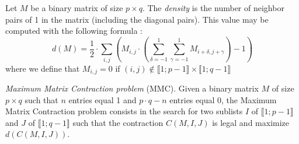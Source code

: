 \begin{definition}
	Let $M$ be a binary matrix of size $p \times q$. The \emph{density} is the number of neighbor pairs of 1 in the matrix (including the diagonal pairs). This value may be computed with the following formula :
	$$ 
	d(M) = \frac{1}{2} \cdot \sum\limits_{i,j} \left( M_{i,j} \cdot \left(\sum\limits_{\delta = -1}^1 \sum\limits_{\gamma = -1}^1  M_{i+\delta,j+\gamma}\right) - 1 \right)
	$$
	where we define that $M_{i,j}=0$ if $(i,j) \notin \llbracket 1;p-1 \rrbracket \times \llbracket 1;q-1 \rrbracket$
\end{definition}

\begin{problem}\label{problem1}
	\emph{Maximum Matrix Contraction problem} (MMC). Given a binary matrix $M$ of size $p \times q$ such that $n$ entries equal 1 and $p \cdot q - n$ entries equal 0, the Maximum Matrix Contraction problem consists in the search for two sublists $I$ of $\llbracket 1;p-1 \rrbracket$ and $J$ of $\llbracket 1;q-1 \rrbracket$ such that the contraction $C(M,I,J)$ is legal and maximize $d(C(M,I,J))$.
\end{problem}

\begin{comment}
Doit-on parler du programme mathématique trivial ici?
\end{comment}


